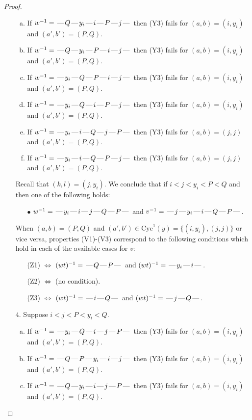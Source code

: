 \documentclass[10pt]{article}
\theoremstyle{definition}
\theoremstyle{definition}
\def\dash{\text{\hspace{0.5mm}---\hspace{0.5mm}}}
\def\Cyc{\mathrm{Cyc}}
\begin{document}
\begin{proof}
\begin{enumerate}
\begin{enumerate}[(a)]
\item If $w^{-1} = \dash Q\dash y_i\dash i\dash P\dash j\dash $ then (Y3) fails for $(a,b)=(i,y_i)$ and $(a',b')=(P,Q)$.
\item If $w^{-1} = \dash Q\dash y_i\dash P\dash i\dash j\dash $ then (Y3) fails for $(a,b)=(i,y_i)$ and $(a',b')=(P,Q)$.
\item If $w^{-1} = \dash y_i\dash Q\dash P\dash i\dash j\dash $ then (Y3) fails for $(a,b)=(i,y_i)$ and $(a',b')=(P,Q)$.
\item If $w^{-1} = \dash y_i\dash Q\dash i\dash P\dash j\dash $ then (Y3) fails for $(a,b)=(i,y_i)$ and $(a',b')=(P,Q)$.
\item If $w^{-1} = \dash y_i\dash i\dash Q\dash j\dash P\dash $ then (Y3) fails for $(a,b)=(j,j)$ and $(a',b')=(P,Q)$.
\item If $w^{-1} = \dash y_i\dash i\dash Q\dash P\dash j\dash $ then (Y3) fails for $(a,b)=(j,j)$ and $(a',b')=(P,Q)$.
\end{enumerate}
Recall that $(k,l) = (j,y_i)$.
We conclude that if $i < j < y_i < P < Q$ and then one of the following holds:
\begin{enumerate}
\item[$\bullet$] $w^{-1} = \dash y_i\dash i\dash j\dash Q\dash P\dash $ and $v^{-1} = \dash j\dash y_i\dash i\dash Q\dash P\dash $.
\end{enumerate}
When $(a,b)= (P,Q)$ and $(a',b')\in \Cyc^1(y)=\{(i,y_i),(j,j)\}$ or vice versa,
properties (V1)-(V3) correspond to the following conditions which hold in
each of the available cases for $v$:
\begin{enumerate}
\item[](Z1) $\Leftrightarrow$ $(wt)^{-1} = \dash Q \dash P \dash$  and $(wt)^{-1} = \dash y_i \dash i \dash$.
\item[](Z2) $\Leftrightarrow$ (no condition).
\item[](Z3) $\Leftrightarrow$ $(wt)^{-1} = \dash i \dash Q \dash$  and $(wt)^{-1} = \dash j \dash Q \dash$.
\end{enumerate}
\item[$4$.] Suppose $i < j < P < y_i < Q$.
\begin{enumerate}[(a)]
\item If $w^{-1} = \dash y_i\dash Q\dash i\dash j\dash P\dash $ then (Y3) fails for $(a,b)=(i,y_i)$ and $(a',b')=(P,Q)$.
\item If $w^{-1} = \dash Q\dash P\dash y_i\dash i\dash j\dash $ then (Y3) fails for $(a,b)=(i,y_i)$ and $(a',b')=(P,Q)$.
\item If $w^{-1} = \dash Q\dash y_i\dash i\dash j\dash P\dash $ then (Y3) fails for $(a,b)=(i,y_i)$ and $(a',b')=(P,Q)$.

\end{enumerate}
\end{enumerate}
\end{proof}
\end{document}
